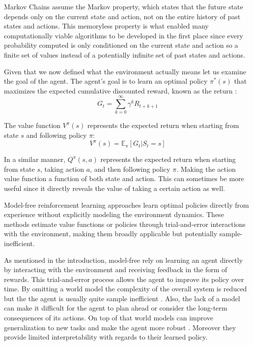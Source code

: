 \documentclass[
	english,
	ruledheaders=section,
	class=report,
	thesis={type=master},
	accentcolor=9c,
	custommargins=true,
	marginpar=false,
	parskip=half-,
	fontsize=11pt,
	pdfa=true,
]{tudapub}
\newcommand{\worldmodel}{world model}
\begin{document}
Markov Chains assume the Markov property, which states that the future state
depends only on the current state and action, not on the entire history of past
states and actions. This memoryless property is what enabled many
computationally viable algorithms to be developed in the first place since
every probability computed is only conditioned on the current state and action
so a finite set of values instead of a potentially infinite set of past states
and actions.

Given that we now defined what the environment actually means let us examine
the goal of the agent. The agent's goal is to learn an optimal policy
$\pi^*(s)$ that maximizes the expected cumulative discounted reward, known as
the return \cite{sutton2018reinforcement}:
\begin{equation}
	G_t = \sum_{k=0}^{\infty} \gamma^k R_{t+k+1}
\end{equation}

The value function $V^\pi(s)$ represents the expected return when starting from
state $s$ and following policy $\pi$:
\begin{equation}
	V^\pi(s) = \mathbb{E}_\pi[G_t | S_t = s]
\end{equation}

In a similar manner, $Q^\pi(s,a)$ represents the expected return when starting
from state $s$, taking action $a$, and then following policy $\pi$. Making the
action value function a function of both state and action. This can sometimes
be more useful since it directly reveals the value of taking a certain action
as well.

Model-free reinforcement learning approaches learn optimal policies directly
from experience without explicitly modeling the environment dynamics. These
methods estimate value functions or policies through trial-and-error
interactions with the environment, making them broadly applicable but
potentially sample-inefficient.

As mentioned in the introduction, model-free rely on learning an agent directly
by interacting with the environment and receiving feedback in the form of
rewards. This trial-and-error process allows the agent to improve its policy
over time. By omitting a \worldmodel{} the complexity of the overall system is
reduced but the the agent is usually quite sample inefficient
\cite{DBLP:conf/icml/DuanCHSA16, DBLP:conf/iclr/KaiserBMOCCEFKL20}. Also, the lack of a model can make
it difficult for the agent to plan ahead or consider the long-term consequences
of its actions. On top of that \worldmodel{}s can improve generalization to new
tasks and make the agent more robust \cite{DBLP:conf/nips/HaS18,DBLP:conf/iclr/HafnerLB020}.
Moreover they provide limited interpretability with regards to their learned
policy.
\end{document}
